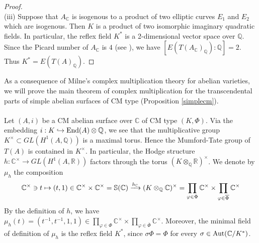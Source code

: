 \documentclass[reqno,a4paper,11pt]{amsart}
\theoremstyle{definition}
\theoremstyle{definition}
\begin{document}
\begin{proof}
       \\\indent (iii) Suppose that $A_{\mathbb{C}}$ is isogenous to a product of two elliptic curves $E_{1}$ and $E_{2}$ which are isogenous. Then $K$ is a product of two isomorphic imaginary quadratic fields. In particular, the reflex field $K^{\ast}$ is a 2-dimensional vector space over $\mathbb{Q}$. Since the Picard number of $A_{\mathbb{C}}$ is $4$ (see \cite[Corollary 2.6]{hulek}), we have $[E(T(A_{\mathbb{C}})_{\mathbb{Q}}): \mathbb{Q}]=2$. Thus  $K^{\ast}=E(T(A)_{\mathbb{Q}})$. 
      \end{proof}
  As a consequence of Milne's complex multiplication theory \cite[Theorem 11.2]{milne2} for abelian varieties,  we will prove the main theorem of complex multiplication for the transcendental parts of simple abelian surfaces of CM type (Proposition \ref{simplecm}).  
  \\\\\indent Let $(A, i)$ be a CM abelian surface over $\mathbb{C}$ of CM type $(K, \Phi)$. Via the embedding  $i: K\hookrightarrow {\rm End}(A)\otimes \mathbb{Q}$, we see that the multiplicative group $K^{\times}\subset GL(H^{1}(A, \mathbb{Q}))$ is a maximal torus. Hence the Mumford-Tate group of $T(A)$ is contained in $K^{\times}$. In particular, the Hodge structure $h: \mathbb{C}^{\times}\to GL(H^{1}(A, \mathbb{R}))$ factors through the torus $(K\otimes_{\mathbb{Q}}\mathbb{R})^{\times}$.  We denote by $\mu_{h}$ the composition \begin{align} \mathbb{C}^{\times}\ni t\mapsto (t, 1)\in \mathbb{C}^{\times}\times \mathbb{C}^{\times}=\mathbb{S}(\mathbb{C})\xrightarrow{h_{\mathbb{C}}} (K\otimes_{\mathbb{Q}}\mathbb{C})^{\times}=\prod_{\varphi\in \Phi}\mathbb{C}^{\times}\times \prod_{\varphi\in \overline{\Phi}}\mathbb{C}^{\times}\notag\end{align}  By the definition of $h$, we have $\mu_{h}(t)=(t^{-1}, t^{-1}, 1, 1)\in \prod_{\varphi\in \Phi}\mathbb{C}^{\times}\times \prod_{\varphi\in \overline{\Phi}}\mathbb{C}^{\times}$.
      Moreover, the minimal field of definition of $\mu_{h}$ is the reflex field $K^{\ast}$, since  $\sigma \Phi=\Phi$ for every $\sigma\in {\rm Aut}(\mathbb{C}/K^{\ast})$. 
\end{document}
